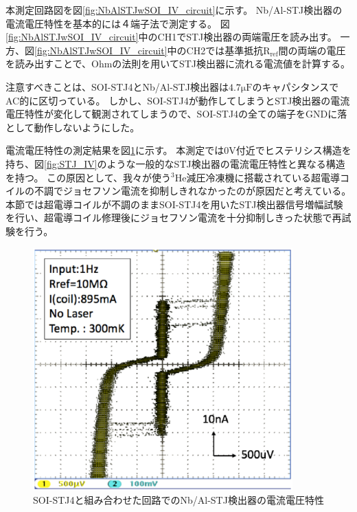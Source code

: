 		本測定回路図を図\ref{fig:NbAlSTJwSOI_IV_circuit}に示す。
		Nb/Al-STJ検出器の電流電圧特性を基本的には４端子法で測定する。
		図\ref{fig:NbAlSTJwSOI_IV_circuit}中のCH1でSTJ検出器の両端電圧を読み出す。
		一方、図\ref{fig:NbAlSTJwSOI_IV_circuit}中のCH2では基準抵抗$\mathrm{R_{ref}}$間の両端の電圧を読み出すことで、Ohmの法則を用いてSTJ検出器に流れる電流値を計算する。
		
		注意すべきことは、SOI-STJ4とNb/Al-STJ検出器は$4.7\mathrm{\mu F}$のキャパシタンスでAC的に区切っている。
		しかし、SOI-STJ4が動作してしまうとSTJ検出器の電流電圧特性が変化して観測されてしまうので、SOI-STJ4の全ての端子をGNDに落として動作しないようにした。
		
		電流電圧特性の測定結果を図\ref{fig:NbAlSTJwSOI_IV_chara}に示す。
		本測定では0V付近でヒステリシス構造を持ち、図\ref{fig:STJ_IV}のような一般的なSTJ検出器の電流電圧特性と異なる構造を持つ。
		この原因として、我々が使う$\mathrm{^{3}He}$減圧冷凍機に搭載されている超電導コイルの不調でジョセフソン電流を抑制しきれなかったのが原因だと考えている。
		本節では超電導コイルが不調のままSOI-STJ4を用いたSTJ検出器信号増幅試験を行い、超電導コイル修理後にジョセフソン電流を十分抑制しきった状態で再試験を行う。
		\clearpage
		\begin{figure}[htbp]
			\begin{center}
				\includegraphics[width=10.0cm]{./Chapter/Chapter4/Picture/NbAlSTJwSOI_IV_chara.eps}
				\caption{SOI-STJ4と組み合わせた回路でのNb/Al-STJ検出器の電流電圧特性}
				\label{fig:NbAlSTJwSOI_IV_chara}
			\end{center}
		\end{figure}
